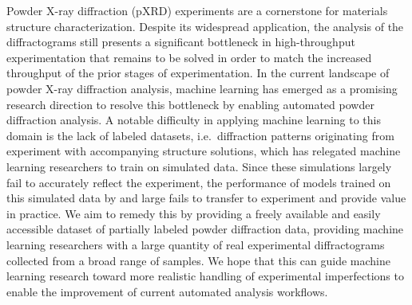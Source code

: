 Powder X-ray diffraction (pXRD) experiments are a cornerstone for materials structure characterization.
Despite its widespread application, the analysis of the diffractograms still presents a significant bottleneck
in high-throughput experimentation that remains to be solved in order to match the increased throughput
of the prior stages of experimentation. In the current landscape of powder X-ray diffraction analysis, machine learning has emerged as a promising research direction to resolve this bottleneck by enabling automated powder diffraction analysis.
A notable difficulty in applying machine learning to this domain is the lack of labeled datasets, i.e.\
diffraction patterns originating from experiment with accompanying structure solutions, which has relegated machine learning
researchers to train on simulated data.
Since these simulations largely fail to accurately reflect the experiment, the performance of models trained
on this simulated data by and large fails to transfer to experiment and provide value in practice.
We aim to remedy this by providing a freely available and easily accessible dataset of partially labeled
powder diffraction data, providing machine learning researchers with a large quantity of real experimental diffractograms collected from a broad range of samples.
We hope that this can guide machine learning research toward more realistic handling of experimental imperfections to enable the improvement of current automated analysis workflows.